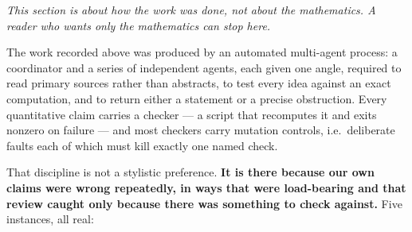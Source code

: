 \documentclass[10pt]{article}
\theoremstyle{plain}
\theoremstyle{definition}
\begin{document}
\emph{This section is about how the work was done, not about the mathematics. A
reader who wants only the mathematics can stop here.}

The work recorded above was produced by an automated multi-agent process: a
coordinator and a series of independent agents, each given one angle, required
to read primary sources rather than abstracts, to test every idea against an
exact computation, and to return either a statement or a precise obstruction.
Every quantitative claim carries a checker --- a script that recomputes it and
exits nonzero on failure --- and most checkers carry mutation controls, i.e.\
deliberate faults each of which must kill exactly one named check.

That discipline is not a stylistic preference. \textbf{It is there because our
own claims were wrong repeatedly, in ways that were load-bearing and that
review caught only because there was something to check against.} Five
instances, all real:
\end{document}
